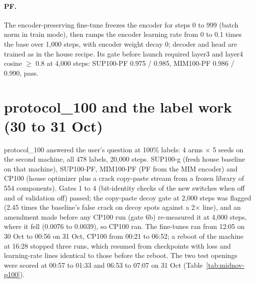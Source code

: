 \paragraph{PF.} The encoder-preserving fine-tune freezes the encoder for steps 0 to 999 (batch norm in train mode), then ramps the
encoder learning rate from 0 to 0.1 times the base over 1,000 steps, with encoder weight decay 0; decoder and head are trained as in
the house recipe. Its gate before launch required layer3 and layer4 cosine $\geq$ 0.8 at 4,000 steps: SUP100-PF 0.975 / 0.985,
MIM100-PF 0.986 / 0.990, pass.

\section{protocol\_100 and the label work (30 to 31 Oct)}\label{sec:midnov-p100}

protocol\_100 answered the user's question at 100\% labels: 4 arms $\times$ 5 seeds on the second machine, all 478 labels, 20,000
steps. SUP100-g (fresh house baseline on that machine), SUP100-PF, MIM100-PF (PF from the MIM encoder) and CP100 (house optimizer
plus a crack copy-paste stream from a frozen library of 554 components). Gates 1 to 4 (bit-identity checks of the new switches when off and of validation off)
passed; the copy-paste decoy gate at 2,000 steps was flagged (2.45 times the baseline's false crack on decoy spots against a 2$\times$
line), and an amendment made before any CP100 run (gate 6b) re-measured it at 4,000 steps, where it fell (0.0076 to 0.0039), so CP100
ran. The fine-tunes ran from 12:05 on 30 Oct to 00:56 on 31 Oct, CP100 from 00:21 to 06:52; a reboot of the machine at 16:28 stopped
three runs, which resumed from checkpoints with loss and learning-rate lines identical to those before the reboot. The two test
openings were scored at 00:57 to 01:33 and 06:53 to 07:07 on 31 Oct (Table~\ref{tab:midnov-p100}).

